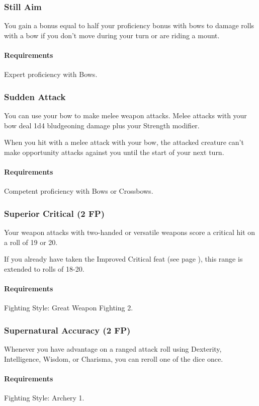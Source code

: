 \subsubsection{Still Aim} \label{feat::stillaim}
    You gain a bonus equal to half your proficiency bonus with bows to damage rolls with a bow if you don't move during your turn or are riding a mount.
    \paragraph{Requirements} Expert proficiency with Bows.
\subsubsection{Sudden Attack} \label{feat::suddenattack}
    You can use your bow to make melee weapon attacks.
    Melee attacks with your bow deal 1d4 bludgeoning damage plus your Strength modifier.

    When you hit with a melee attack with your bow, the attacked creature can't make opportunity attacks against you until the start of your next turn.
    \paragraph{Requirements} Competent proficiency with Bows or Crossbows.
\subsubsection{Superior Critical (2 FP)} \label{feat::superiorcritical}
    Your weapon attacks with two-handed or versatile weapons score a critical hit on a roll of 19 or 20.

    If you already have taken the Improved Critical feat (see page \pageref{feat::improvedcritical}), this range is extended to rolls of 18-20.
    \paragraph{Requirements} Fighting Style: Great Weapon Fighting 2.
\subsubsection{Supernatural Accuracy (2 FP)} \label{feat::supernaturalaccuracy}
    Whenever you have advantage on a ranged attack roll using Dexterity, Intelligence, Wisdom, or Charisma, you can reroll one of the dice once.
    \paragraph{Requirements} Fighting Style: Archery 1.
